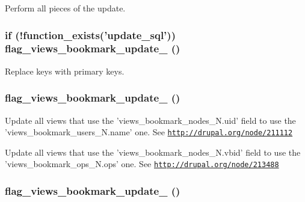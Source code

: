 Perform all pieces of the update. \hypertarget{flag_8views__bookmark_8inc_9ce164c1880b7c9c3b5b51c3b2aa06d6}{
\subsubsection[{flag\_\-views\_\-bookmark\_\-update\_\-1}]{\setlength{\rightskip}{0pt plus 5cm}if (!function\_\-exists('update\_\-sql')) flag\_\-views\_\-bookmark\_\-update\_ ()}}
\label{flag_8views__bookmark_8inc_9ce164c1880b7c9c3b5b51c3b2aa06d6}


Replace keys with primary keys. \hypertarget{flag_8views__bookmark_8inc_cc71127082d102ce3a9b4bed39743f83}{
\subsubsection[{flag\_\-views\_\-bookmark\_\-update\_\-5101}]{\setlength{\rightskip}{0pt plus 5cm}flag\_\-views\_\-bookmark\_\-update\_ ()}}
\label{flag_8views__bookmark_8inc_cc71127082d102ce3a9b4bed39743f83}


Update all views that use the 'views\_\-bookmark\_\-nodes\_\-N.uid' field to use the 'views\_\-bookmark\_\-users\_\-N.name' one. See \href{http://drupal.org/node/211112}{\tt http://drupal.org/node/211112}

Update all views that use the 'views\_\-bookmark\_\-nodes\_\-N.vbid' field to use the 'views\_\-bookmark\_\-ops\_\-N.ops' one. See \href{http://drupal.org/node/213488}{\tt http://drupal.org/node/213488} \hypertarget{flag_8views__bookmark_8inc_298793c4236ee9f00e26b9d0ec7d7e7d}{
\subsubsection[{flag\_\-views\_\-bookmark\_\-update\_\-5102}]{\setlength{\rightskip}{0pt plus 5cm}flag\_\-views\_\-bookmark\_\-update\_ ()}}
\label{flag_8views__bookmark_8inc_298793c4236ee9f00e26b9d0ec7d7e7d}


